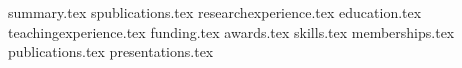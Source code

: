 \documentclass[11pt, a4paper]{awesome-cv}
\newcommand*{\sectiondir}{resume/}
\begin{document}
\makecvheader

{summary.tex}
{spublications.tex}
{researchexperience.tex}
{education.tex}
{teachingexperience.tex}
{funding.tex}
{awards.tex}
{skills.tex}
{memberships.tex}
{publications.tex}
\pagebreak
{presentations.tex}
\end{document}
